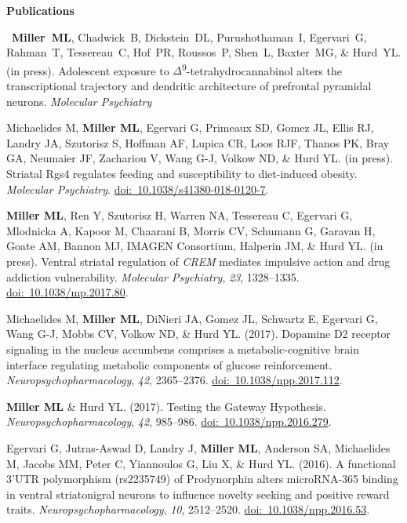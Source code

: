 \documentclass[10pt]{article}
\begin{document}
\vspace{0.1in}
{\large \textbf{Publications}}

\begin{description}

\item~\textbf{Miller~ML}, Chadwick~B, Dickstein~DL, Purushothaman~I, Egervari~G, Rahman~T, Tessereau~C, Hof~PR, Roussos~P, Shen~L, Baxter~MG, \& Hurd~YL. (in press). Adolescent exposure to $\Delta$\textsuperscript{9}-tetrahydrocannabinol alters the transcriptional trajectory and dendritic architecture of prefrontal pyramidal neurons. \textit{Molecular Psychiatry}
\item Michaelides M, \textbf{Miller ML}, Egervari G, Primeaux SD, Gomez JL, Ellis RJ, Landry JA, Szutorisz S, Hoffman AF, Lupica CR, Loos RJF, Thanos PK, Bray GA, Neumaier JF, Zachariou V, Wang G-J, Volkow ND, \& Hurd YL. (in press). Striatal Rgs4 regulates feeding and susceptibility to diet-induced obesity. \textit{Molecular Psychiatry}. \href{https://doi.org/10.1038/s41380-018-0120-7}{doi:~10.1038/s41380-018-0120-7}.
\item \textbf{Miller ML}, Ren Y, Szutorisz H, Warren NA, Tessereau C, Egervari G, Mlodnicka A, Kapoor M, Chaarani B, Morris CV, Schumann G, Garavan H, Goate AM, Bannon MJ, IMAGEN Consortium, Halperin JM, \& Hurd YL. (in press). Ventral striatal regulation of \textit{CREM} mediates impulsive action and drug addiction vulnerability. \textit{Molecular Psychiatry}, \textit{23}, 1328--1335. \href{https://doi.org/10.1038/mp.2017.80}{doi:~10.1038/mp.2017.80}.
\item Michaelides M, \textbf{Miller ML}, DiNieri JA, Gomez JL, Schwartz E, Egervari G, Wang G-J, Mobbs CV, Volkow ND, \& Hurd YL. (2017). Dopamine D2 receptor signaling in the nucleus accumbens comprises a metabolic-cognitive brain interface regulating metabolic components of glucose reinforcement. \textit{Neuropsychopharmacology}, \textit{42}, 2365--2376. \href{https://doi.org/10.1038/npp.2017.112}{doi:~10.1038/npp.2017.112}.
\item \textbf{Miller ML} \& Hurd YL. (2017). Testing the Gateway Hypothesis. \textit{Neuropsychopharmacology}, \textit{42}, 985--986. \href{https://doi.org/10.1038/npp.2016.279}{doi:~10.1038/npp.2016.279}.
\item Egervari G, Jutras-Aswad D, Landry J, \textbf{Miller ML}, Anderson SA, Michaelides M, Jacobs MM, Peter C, Yiannoulos G, Liu X, \& Hurd YL. (2016). A functional 3’UTR polymorphism (rs2235749) of Prodynorphin alters microRNA-365 binding in ventral striatonigral neurons to influence novelty seeking and positive reward traits. \textit{Neuropsychopharmacology}, \textit{10}, 2512--2520. \href{https://doi.org/10.1038/npp.2016.53}{doi:~10.1038/npp.2016.53}.

\end{description}
\end{document}
